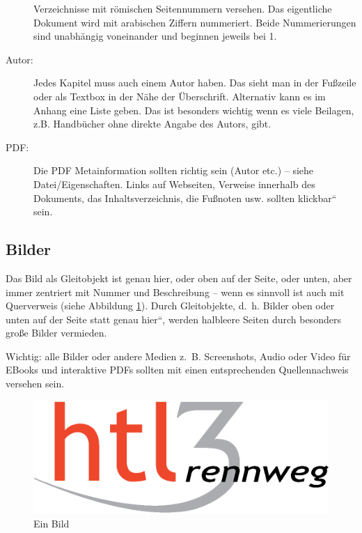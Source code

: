 \begin{description}
Verzeichnisse mit römischen Seitennummern versehen. Das eigentliche
Dokument wird mit arabischen Ziffern nummeriert. Beide Nummerierungen
sind unabhängig voneinander und beginnen jeweils bei 1.
\item [{Autor:}] Jedes Kapitel muss auch einem Autor haben. Das sieht man
in der Fußzeile oder als Textbox in der Nähe der Überschrift. Alternativ
kann es im Anhang eine Liste geben. Das ist besonders wichtig wenn
es viele Beilagen, z.B. Handbücher ohne direkte Angabe des Autors,
gibt.
\item [{PDF:}] Die PDF Metainformation sollten richtig sein (Autor etc.)
-- siehe Datei/Eigenschaften. Links auf Webseiten, Verweise innerhalb
des Dokuments, das Inhaltsverzeichnis, die Fußnoten usw. sollten \quotedblbase klickbar``
sein.
\end{description}

\subsection{Bilder\label{sub:Bilder}}

Das Bild als Gleitobjekt ist genau hier, oder oben auf der Seite,
oder unten, aber immer zentriert mit Nummer und Beschreibung -- wenn
es sinnvoll ist auch mit Querverweis (siehe Abbildung \ref{Bild11}).
Durch Gleitobjekte, d.~h. Bilder oben oder unten auf der Seite statt
\quotedblbase genau hier``, werden halbleere Seiten durch besonders
große Bilder vermieden.

Wichtig: alle Bilder oder andere Medien z.~B. Screenshots, Audio
oder Video für EBooks und interaktive PDFs sollten mit einen entsprechenden
Quellennachweis versehen sein.

\begin{figure}[tbh]
\begin{centering}
\includegraphics[scale=0.6]{HTL3RLogoRGB}
\par\end{centering}

\caption{Ein Bild}
\label{Bild11}
\end{figure}



